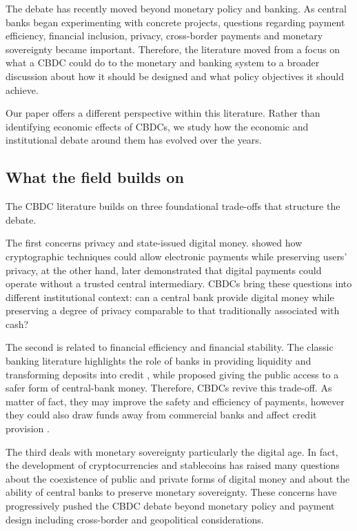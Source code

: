 \documentclass[11pt,a4paper]{article}
\begin{document}
The debate has recently moved beyond monetary policy and banking. As central banks began 
experimenting with concrete projects, questions regarding payment efficiency, financial 
inclusion, privacy, cross-border payments and monetary sovereignty became important. 
Therefore, the literature moved from a focus on what a CBDC could do to the monetary 
and banking system to a broader discussion about how it should be designed and what policy 
objectives it should achieve.

Our paper offers a different perspective within this literature. Rather than identifying 
economic effects of CBDCs, we study how the economic and institutional debate around them 
has evolved over the years.
\subsection{What the field builds on}%
The CBDC literature builds on three foundational trade-offs that structure the debate.

The first concerns privacy and state-issued digital money. \textcite{chaum1983} showed how cryptographic techniques could allow 
electronic payments while preserving users’ privacy, at the other hand, \textcite{nakamoto2008} later demonstrated that digital 
payments could operate without a trusted central intermediary. CBDCs bring these questions into different institutional context: 
can a central bank provide digital money while preserving a degree of privacy comparable to that traditionally associated with 
cash?

The second is related to financial efficiency and financial stability. The classic banking literature highlights the role of banks 
in providing liquidity and transforming deposits into credit \parencite{diamond1983}, while \textcite{tobin1987} proposed giving 
the public access to a safer form of central-bank money. Therefore, CBDCs revive this trade-off. As matter of fact, they may 
improve the safety and efficiency of payments, however they could also draw funds away from commercial banks and affect credit 
provision \parencite{andolfatto2020,brunnermeier2019}.

The third deals with monetary sovereignty particularly the digital age. In fact, the development of cryptocurrencies and stablecoins 
has raised many questions about the coexistence of public and private forms of digital money and about the ability of central 
banks to preserve monetary sovereignty. These concerns have progressively pushed the CBDC debate beyond monetary policy and 
payment design including cross-border and geopolitical considerations.
\end{document}
